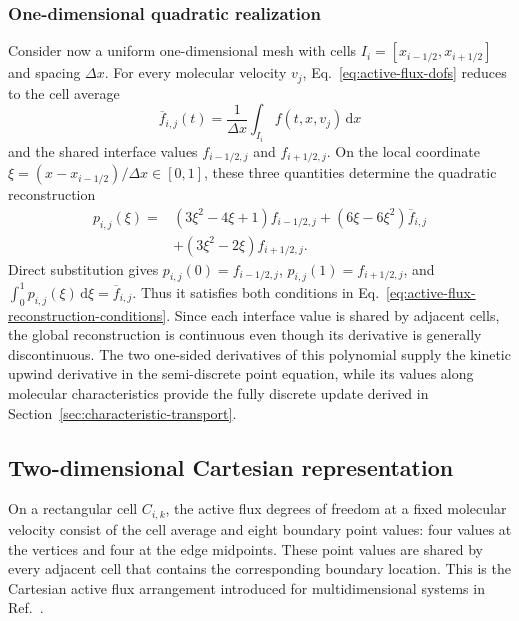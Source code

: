 \documentclass[preprint,3p,12pt]{elsarticle}
\newcommand{\dd}{\,\mathrm{d}}
\newcommand{\avg}[1]{\overline{#1}}
\begin{document}
\subsubsection{One-dimensional quadratic realization}

Consider now a uniform one-dimensional mesh with cells $I_i=[x_{i-1/2},x_{i+1/2}]$ and spacing $\Delta x$. For every molecular velocity $v_j$, Eq.~\eqref{eq:active-flux-dofs} reduces to the cell average
\begin{equation}
  \avg{f}_{i,j}(t)
  = \frac{1}{\Delta x}\int_{I_i} f(t,x,v_j)\dd x
  \label{eq:cell-average}
\end{equation}
and the shared interface values $f_{i-1/2,j}$ and $f_{i+1/2,j}$. On the local coordinate $\xi=(x-x_{i-1/2})/\Delta x\in[0,1]$, these three quantities determine the quadratic reconstruction
\begin{align}
  p_{i,j}(\xi)
  ={}& (3\xi^2-4\xi+1)f_{i-1/2,j}
  +(6\xi-6\xi^2)\avg{f}_{i,j} \nonumber\\
  &+(3\xi^2-2\xi)f_{i+1/2,j}.
  \label{eq:quadratic-reconstruction}
\end{align}
Direct substitution gives $p_{i,j}(0)=f_{i-1/2,j}$, $p_{i,j}(1)=f_{i+1/2,j}$, and $\int_0^1p_{i,j}(\xi)\dd\xi=\avg{f}_{i,j}$. Thus it satisfies both conditions in Eq.~\eqref{eq:active-flux-reconstruction-conditions}. Since each interface value is shared by adjacent cells, the global reconstruction is continuous even though its derivative is generally discontinuous. The two one-sided derivatives of this polynomial supply the kinetic upwind derivative in the semi-discrete point equation, while its values along molecular characteristics provide the fully discrete update derived in Section~\ref{sec:characteristic-transport}.

\subsection{Two-dimensional Cartesian representation}

On a rectangular cell $C_{i,k}$, the active flux degrees of freedom at a fixed molecular velocity consist of the cell average and eight boundary point values: four values at the vertices and four at the edge midpoints. These point values are shared by every adjacent cell that contains the corresponding boundary location. This is the Cartesian active flux arrangement introduced for multidimensional systems in Ref.~\cite{barsukow2019cartesian}.
\end{document}
